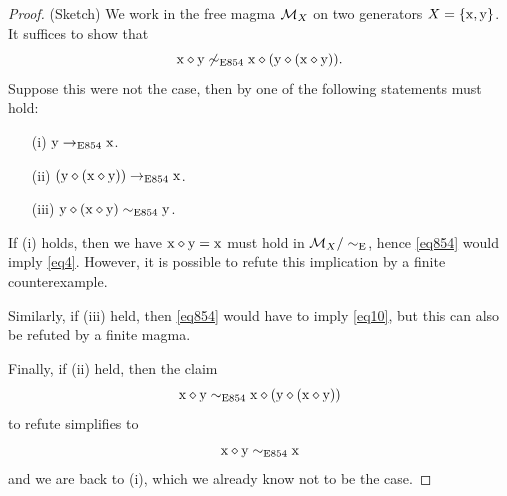\begin{proof}(Sketch)
  We work in the free magma ${\mathcal{M}}_X$ on two generators $X = \{\mathrm{x},\mathrm{y}\}$.  It suffices to show that
$$  \mathrm{x} \diamond \mathrm{y} \not \sim_{\mathrm{E}854} \mathrm{x} \diamond (\mathrm{y} \diamond (\mathrm{x} \diamond \mathrm{y})).$$
Suppose this were not the case, then by  one of the following statements must hold:
\begin{itemize}
\item[(i)] $\mathrm{y} \to_{\mathrm{E}854} \mathrm{x}$.
\item[(ii)] $(\mathrm{y} \diamond (\mathrm{x} \diamond \mathrm{y})) \to_{\mathrm{E}854} \mathrm{x}$.
\item[(iii)] $\mathrm{y} \diamond (\mathrm{x} \diamond \mathrm{y}) \sim_{\mathrm{E}854} \mathrm{y}$.
\end{itemize}
If (i) holds, then we have $\mathrm{x} \diamond \mathrm{y} = \mathrm{x}$ must hold in ${\mathcal{M}}_X/\sim_{\mathrm{E}}$, hence \eqref{eq854} would imply \eqref{eq4}.  However, it is possible to refute this implication by a finite counterexample.

Similarly, if (iii) held, then \eqref{eq854} would have to imply \eqref{eq10}, but this can also be refuted by a finite magma.

Finally, if (ii) held, then the claim
$$  \mathrm{x} \diamond \mathrm{y} \sim_{\mathrm{E}854} \mathrm{x} \diamond (\mathrm{y} \diamond (\mathrm{x} \diamond \mathrm{y}))$$
to refute simplifies to
$$  \mathrm{x} \diamond \mathrm{y} \sim_{\mathrm{E}854} \mathrm{x}$$
and we are back to (i), which we already know not to be the case.
\end{proof}
